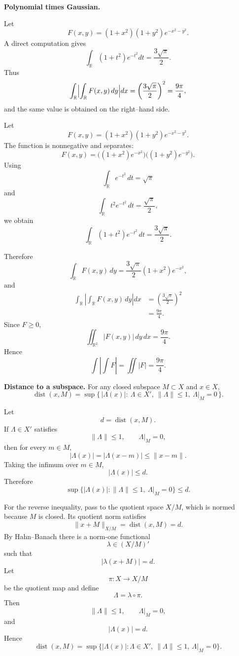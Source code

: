 \begin{problem}[CP-II-0509]
\label{prob:cp-ii-0509}
\textbf{Polynomial times Gaussian.}

\hspace*{1.5em}Let
\[
F(x,y) = (1+x^2)(1+y^2)e^{-x^2-y^2}.
\]
A direct computation gives
\[
\int_{\mathbb{R}}(1+t^2)e^{-t^2}dt = \frac{3\sqrt{\pi}}{2}.
\]
Thus
\[
\int_{\mathbb{R}}\Bigl|\int_{\mathbb{R}}F(x,y)\,dy\Bigr|dx
= \left(\frac{3\sqrt{\pi}}{2}\right)^2
= \frac{9\pi}{4},
\]
and the same value is obtained on the right--hand side.
\end{problem}

\begin{solution}
Let
\[
F(x,y)
=
(1+x^2)(1+y^2)e^{-x^2-y^2}.
\]
The function is nonnegative and separates:
\[
F(x,y)
=
\bigl((1+x^2)e^{-x^2}\bigr)
\bigl((1+y^2)e^{-y^2}\bigr).
\]
Using
\[
\int_{\mathbb R}e^{-t^2}\,dt=\sqrt\pi
\]
and
\[
\int_{\mathbb R}t^2e^{-t^2}\,dt=\frac{\sqrt\pi}{2},
\]
we obtain
\[
\int_{\mathbb R}(1+t^2)e^{-t^2}\,dt
=
\frac{3\sqrt\pi}{2}.
\]

Therefore
\[
\int_{\mathbb R}F(x,y)\,dy
=
\frac{3\sqrt\pi}{2}
(1+x^2)e^{-x^2},
\]
and
\[
\begin{aligned}
\int_{\mathbb R}
\left|
\int_{\mathbb R}F(x,y)\,dy
\right|dx
&=
\left(
\frac{3\sqrt\pi}{2}
\right)^2\\
&=
\frac{9\pi}{4}.
\end{aligned}
\]
Since \(F\ge0\),
\[
\iint_{\mathbb R^2}|F(x,y)|\,dy\,dx
=
\frac{9\pi}{4}.
\]
Hence
\[
\boxed{
\int\left|\int F\right|
=
\iint|F|
=
\frac{9\pi}{4}.
}
\]
\end{solution}


\begin{problem}[CP-II-0511]
\label{prob:cp-ii-0511}
\textbf{Distance to a subspace.}
		For any closed subspace $M\subset X$ and $x\in X$,
		\[
		\operatorname{dist}(x,M)
		=\sup\{\,|\Lambda(x)|:\ \Lambda\in X',\ \|\Lambda\|\le1,\ \Lambda|_M=0\,\}.
		\]
\end{problem}

\begin{solution}
Let
\[
d=\operatorname{dist}(x,M).
\]
If \(\Lambda\in X'\) satisfies
\[
\|\Lambda\|\le1,
\qquad
\Lambda|_M=0,
\]
then for every \(m\in M\),
\[
|\Lambda(x)|
=
|\Lambda(x-m)|
\le
\|x-m\|.
\]
Taking the infimum over \(m\in M\),
\[
|\Lambda(x)|
\le
d.
\]
Therefore
\[
\sup\{
|\Lambda(x)|:
\|\Lambda\|\le1,\ \Lambda|_M=0
\}
\le d.
\]

For the reverse inequality, pass to the quotient space \(X/M\), which is normed because
\(M\) is closed. Its quotient norm satisfies
\[
\|x+M\|_{X/M}
=
\operatorname{dist}(x,M)
=
d.
\]
By Hahn--Banach there is a norm-one functional
\[
\lambda\in(X/M)'
\]
such that
\[
|\lambda(x+M)|=d.
\]
Let
\[
\pi:X\to X/M
\]
be the quotient map and define
\[
\Lambda=\lambda\circ\pi.
\]
Then
\[
\|\Lambda\|\le1,
\qquad
\Lambda|_M=0,
\]
and
\[
|\Lambda(x)|=d.
\]
Hence
\[
\boxed{
\operatorname{dist}(x,M)
=
\sup\{
|\Lambda(x)|:
\Lambda\in X',\
\|\Lambda\|\le1,\
\Lambda|_M=0
\}.
}
\]
\end{solution}


